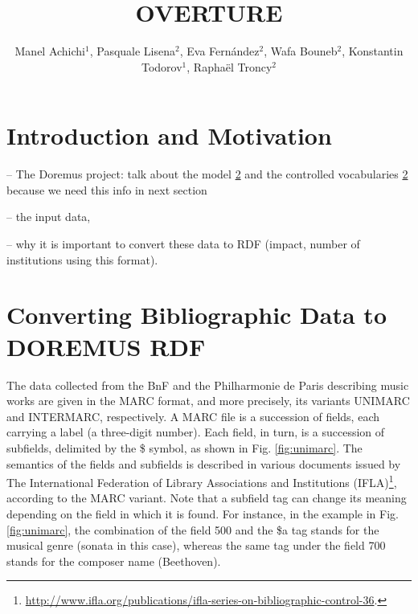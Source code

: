 \documentclass[runningheads,a4paper]{llncs}
\begin{document}
\title{OVERTURE}


\author{Manel Achichi$^1$, Pasquale Lisena$^2$, Eva Fern\'{a}ndez$^2$, Wafa Bouneb$^2$, Konstantin Todorov$^1$, Rapha\"{e}l Troncy$^2$}

\maketitle


\begin{abstract}

\end{abstract}


\section{Introduction and Motivation}

-- The Doremus project: talk about the model \ref{} and the controlled vocabularies \ref{} because we need this info in next section

-- the input data, 

-- why it is important to convert these data to RDF (impact, number of institutions using this format).


\section{Converting Bibliographic Data to DOREMUS RDF}

The data collected from the BnF and the Philharmonie de Paris describing music works are given in the MARC format, and more precisely, its variants UNIMARC and INTERMARC, respectively. A MARC file is a succession of fields, each carrying a label (a three-digit number). Each field, in turn, is a succession of subfields, delimited by the \$ symbol, as shown in Fig. \ref{fig:unimarc}. The semantics of the fields and subfields is described in various documents issued by The International Federation of Library Associations and Institutions  (IFLA)\footnote{\url{http://www.ifla.org/publications/ifla-series-on-bibliographic-control-36}.}, according to the MARC variant. Note that a subfield tag can change its meaning depending on the field in which it is found. For instance, in the example in Fig. \ref{fig:unimarc}, the combination of the field 500 and the \$a tag stands for the musical genre (sonata in this case), whereas the same tag under the field 700 stands for the composer name (Beethoven).
\end{document}
